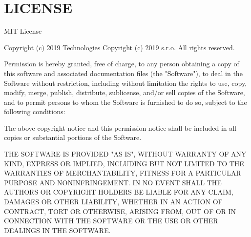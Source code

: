 \chapter{LICENSE}
\hypertarget{md__library_2_package_cache_2com_8unity_8ide_8rider_0d3_80_828_2_l_i_c_e_n_s_e}{}\label{md__library_2_package_cache_2com_8unity_8ide_8rider_0d3_80_828_2_l_i_c_e_n_s_e}
MIT License

Copyright (c) 2019  Technologies Copyright (c) 2019  s.\+r.\+o. All rights reserved.

Permission is hereby granted, free of charge, to any person obtaining a copy of this software and associated documentation files (the "{}\+Software"{}), to deal in the Software without restriction, including without limitation the rights to use, copy, modify, merge, publish, distribute, sublicense, and/or sell copies of the Software, and to permit persons to whom the Software is furnished to do so, subject to the following conditions\+:

The above copyright notice and this permission notice shall be included in all copies or substantial portions of the Software.

THE SOFTWARE IS PROVIDED "{}\+AS IS"{}, WITHOUT WARRANTY OF ANY KIND, EXPRESS OR IMPLIED, INCLUDING BUT NOT LIMITED TO THE WARRANTIES OF MERCHANTABILITY, FITNESS FOR A PARTICULAR PURPOSE AND NONINFRINGEMENT. IN NO EVENT SHALL THE AUTHORS OR COPYRIGHT HOLDERS BE LIABLE FOR ANY CLAIM, DAMAGES OR OTHER LIABILITY, WHETHER IN AN ACTION OF CONTRACT, TORT OR OTHERWISE, ARISING FROM, OUT OF OR IN CONNECTION WITH THE SOFTWARE OR THE USE OR OTHER DEALINGS IN THE SOFTWARE. 